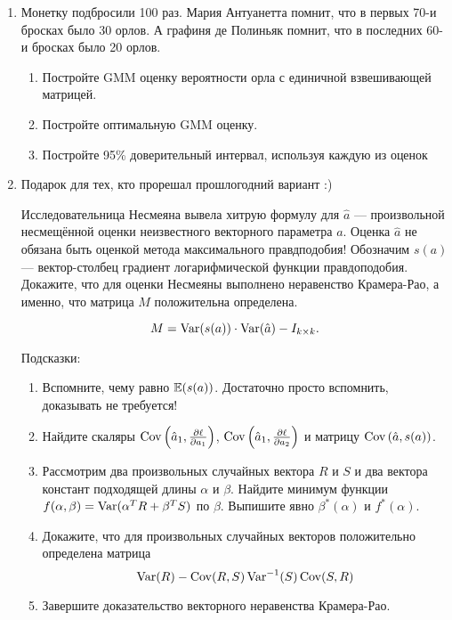\begin{enumerate}
\item Монетку подбросили 100 раз. Мария Антуанетта помнит, что в первых 70-и бросках было 30 орлов.
А графиня де Полиньяк помнит, что в последних 60-и бросках было 20 орлов.


\begin{enumerate}
  \item Постройте GMM оценку вероятности орла с единичной взвешивающей матрицей.
  \item Постройте оптимальную GMM оценку.
  \item Постройте 95\% доверительный интервал, используя каждую из оценок
\end{enumerate}

\newpage
\item Подарок для тех, кто прорешал прошлогодний вариант :)


   Исследовательница Несмеяна вывела хитрую формулу для $\hat a$ — произвольной несмещённой оценки неизвестного векторного параметра $a$. Оценка $\hat a$ не обязана быть оценкой метода максимального правдподобия!
    Обозначим $s(a)$ — вектор-столбец градиент логарифмической функции правдоподобия. Докажите, что для оценки Несмеяны выполнено неравенство Крамера-Рао,
    а именно, что матрица $M$  положительна определена.

\[
M = \operatorname{Var}(s(a))\cdot \operatorname{Var}(\hat a) - I_{k\times k}.
\]


Подсказки:

    \begin{enumerate}
      \item Вспомните, чему равно $\operatorname{\mathbb{E}}(s(a))$. Достаточно просто вспомнить, доказывать не требуется!
      \item Найдите скаляры $\operatorname{Cov}\left(\hat a_1, \frac{\partial \ell}{\partial a_1}\right)$,
	$\operatorname{Cov}\left(\hat a_1, \frac{\partial \ell}{\partial a_2}\right)$
	и матрицу $\operatorname{Cov}\left(\hat a, s(a) \right)$.
      \item Рассмотрим два произвольных случайных вектора $R$ и $S$ и два вектора констант подходящей длины $\alpha$ и $\beta$.
	Найдите минимум функции $f(\alpha, \beta) = \operatorname{Var}(\alpha^T R + \beta^T S)$ по $\beta$.
	Выпишите явно $\beta^*(\alpha)$ и $f^*(\alpha)$.
      \item Докажите, что для произвольных случайных векторов положительно определена матрица
	\[
          \operatorname{Var}(R) - \operatorname{Cov}(R, S) \operatorname{Var}^{-1}(S)\operatorname{Cov}(S, R)
	\]
      \item Завершите доказательство векторного неравенства Крамера-Рао.


    \end{enumerate}


\end{enumerate}
